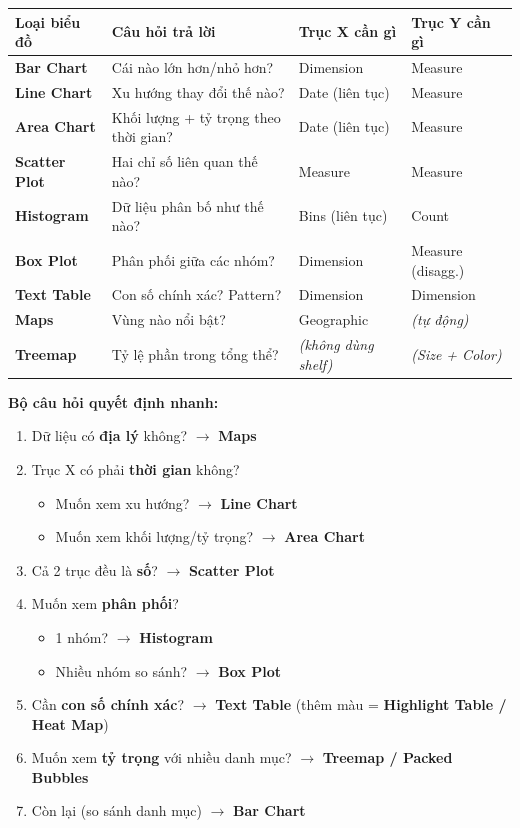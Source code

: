 \documentclass[12pt]{article}
\begin{document}
\begin{center}
\renewcommand{\arraystretch}{1.3}
\small
\begin{tabularx}{\linewidth}{l X l l}
\toprule
\textbf{Loại biểu đồ} & \textbf{Câu hỏi trả lời} & \textbf{Trục X cần gì} & \textbf{Trục Y cần gì} \\
\midrule
\textbf{Bar Chart} & Cái nào lớn hơn/nhỏ hơn? & Dimension & Measure \\
\textbf{Line Chart} & Xu hướng thay đổi thế nào? & Date (liên tục) & Measure \\
\textbf{Area Chart} & Khối lượng + tỷ trọng theo thời gian? & Date (liên tục) & Measure \\
\textbf{Scatter Plot} & Hai chỉ số liên quan thế nào? & Measure & Measure \\
\textbf{Histogram} & Dữ liệu phân bố như thế nào? & Bins (liên tục) & Count \\
\textbf{Box Plot} & Phân phối giữa các nhóm? & Dimension & Measure (disagg.) \\
\textbf{Text Table} & Con số chính xác? Pattern? & Dimension & Dimension \\
\textbf{Maps} & Vùng nào nổi bật? & Geographic & \textit{(tự động)} \\
\textbf{Treemap} & Tỷ lệ phần trong tổng thể? & \textit{(không dùng shelf)} & \textit{(Size + Color)} \\
\bottomrule
\end{tabularx}
\end{center}

\noindent \textbf{Bộ câu hỏi quyết định nhanh:}

\begin{enumerate}[nosep]
    \item Dữ liệu có \textbf{địa lý} không? $\rightarrow$ \textbf{Maps}
    \item Trục X có phải \textbf{thời gian} không?
    \begin{itemize}[nosep]
        \item Muốn xem xu hướng? $\rightarrow$ \textbf{Line Chart}
        \item Muốn xem khối lượng/tỷ trọng? $\rightarrow$ \textbf{Area Chart}
    \end{itemize}
    \item Cả 2 trục đều là \textbf{số}? $\rightarrow$ \textbf{Scatter Plot}
    \item Muốn xem \textbf{phân phối}?
    \begin{itemize}[nosep]
        \item 1 nhóm? $\rightarrow$ \textbf{Histogram}
        \item Nhiều nhóm so sánh? $\rightarrow$ \textbf{Box Plot}
    \end{itemize}
    \item Cần \textbf{con số chính xác}? $\rightarrow$ \textbf{Text Table} (thêm màu = \textbf{Highlight Table / Heat Map})
    \item Muốn xem \textbf{tỷ trọng} với nhiều danh mục? $\rightarrow$ \textbf{Treemap / Packed Bubbles}
    \item Còn lại (so sánh danh mục) $\rightarrow$ \textbf{Bar Chart}
\end{enumerate}
\end{document}
